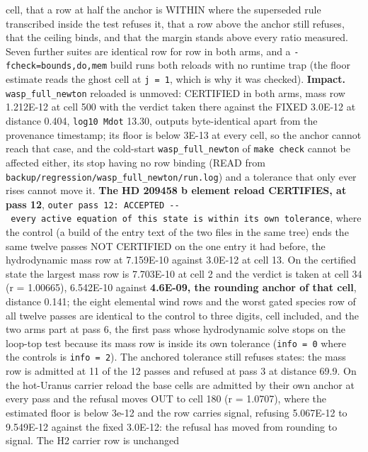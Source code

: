\documentclass[english,a4paper]{my_memo}
\begin{document}
\begin{itemize}
  cell, that a row at half the anchor is WITHIN where the superseded rule
  transcribed inside the test refuses it, that a row above the anchor still
  refuses, that the ceiling binds, and that the margin stands above every ratio
  measured. Seven further suites are identical row for row in both arms, and a
  \texttt{-fcheck=bounds,do,mem} build runs both reloads with no runtime trap (the
  floor estimate reads the ghost cell at \texttt{j\ =\ 1}, which is why it was checked).
  \textbf{Impact.} \texttt{wasp\_full\_newton} reloaded is unmoved: CERTIFIED in both arms,
  mass row 1.212E-12 at cell 500 with the verdict taken there against the FIXED
  3.0E-12 at distance 0.404, \texttt{log10\ Mdot} 13.30, outputs byte-identical apart
  from the provenance timestamp; its floor is below 3E-13 at every cell, so the
  anchor cannot reach that case, and the cold-start \texttt{wasp\_full\_newton} of
  \texttt{make\ check} cannot be affected either, its stop having no row binding (READ
  from \texttt{backup/regression/wasp\_full\_newton/run.log}) and a tolerance that only
  ever rises cannot move it. \textbf{The HD 209458 b element reload CERTIFIES, at
  pass 12}, \texttt{outer\ pass\ 12:\ ACCEPTED\ -\/-\ every\ active\ equation\ of\ this\ state\ is\ within\ its\ own\ tolerance}, where the control (a build of the entry text of
  the two files in the same tree) ends the same twelve passes NOT CERTIFIED on
  the one entry it had before, the hydrodynamic mass row at 7.159E-10 against
  3.0E-12 at cell 13. On the certified state the largest mass row is 7.703E-10
  at cell 2 and the verdict is taken at cell 34 (r = 1.00665), 6.542E-10
  against \textbf{4.6E-09, the rounding anchor of that cell}, distance 0.141; the
  eight elemental wind rows and the worst gated species row of all twelve
  passes are identical to the control to three digits, cell included, and the
  two arms part at pass 6, the first pass whose hydrodynamic solve stops on the
  loop-top test because its mass row is inside its own tolerance (\texttt{info\ =\ 0}
  where the control\textquotesingle s is \texttt{info\ =\ 2}). The anchored tolerance still refuses
  states: the mass row is admitted at 11 of the 12 passes and refused at pass 3
  at distance 69.9. On the hot-Uranus carrier reload the base cells are
  admitted by their own anchor at every pass and the refusal moves OUT to cell
  180 (r = 1.0707), where the estimated floor is below 3e-12 and the row
  carries signal, refusing 5.067E-12 to 9.549E-12 against the fixed 3.0E-12: the
  refusal has moved from rounding to signal. The H2 carrier row is unchanged

\end{itemize}
\end{document}
